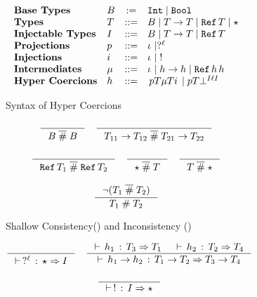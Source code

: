 \documentclass[acmtog, authorversion, acmlarge]{acmart}
\begin{document}
\begin{figure}[tbh]
  \small
  \begin{subfigure}{.5\textwidth}
    \[
    \begin{array}{llcl}
      \textbf{Base Types} &
      B & := & \texttt{Int} \mid \texttt{Bool} \\
      \textbf{Types} &
      T    & ::= & B \mid T  \to  T \mid \texttt{Ref} \, T \mid \star \\
      \textbf{Injectable Types} &
      I    & ::= & B \mid T  \to  T \mid \texttt{Ref} \, T \\
      \textbf{Projections}&
      p  & ::= & \iota_{} \mid  ?^{\ell} \\
      \textbf{Injections}&
      i  & ::= & \iota_{} \mid \;  ! \\
      \textbf{Intermediates}&
      \mu  & ::= & \iota_{} \mid h  \to  h \mid \texttt{Ref} \, h \, h\\
      \textbf{Hyper Coercions}&
      h   & ::= & \, p T \mu T i \, \mid p T \bot^{I \ell I}
    \end{array}
    \]
    \caption{Syntax of Hyper Coercions}
    \label{fig:hcSyntax}
  \end{subfigure}%
  \begin{subfigure}{0.5\textwidth}
    \begin{gather*}
      \inference{}{\B \sct \B}
      \quad
      \inference{}{\Fn{\T_{11}}{\T_{12}} \sct \Fn{\T_{21}}{\T_{22}}}
      \\[2ex]
      \inference{}{\Ref{\T_{1}} \sct \Ref{\T_{2}}}
      \quad
      \inference{}{\Dyn \sct \T}
      \quad
      \inference{}{\T \sct \Dyn}
      \\[2ex]
      \inference{\neg (\T_1 \sct \T_2)}{\T_1 \sic \T_2}
    \end{gather*}
    \caption{Shallow Consistency(\sct) and Inconsistency (\sic)}
    \label{fig:shallowConsistency}
  \end{subfigure}
  \begin{subfigure}{.5\textwidth}
    \begin{gather*}
      \inference{}{\cwt{\prj{\Lbl}}{\Dyn}{\I}}
      \quad
      \inference{\cwt{\HC_1}{\T_{3}}{\T_{1}} &
                 \cwt{\HC_2}{\T_{2}}{\T_{4}}}
                {\cwt{\fn{\HC_1}{\HC_2}}
                     {\Fn{\T_{1}}{\T_{2}}}
                     {\Fn{\T_{3}}{\T_{4}}}}
      \\[2ex]
      \inference{}{\cwt{\inj}{\I}{\Dyn}}      

\end{gather*}
\end{subfigure}
\end{figure}
\end{document}
